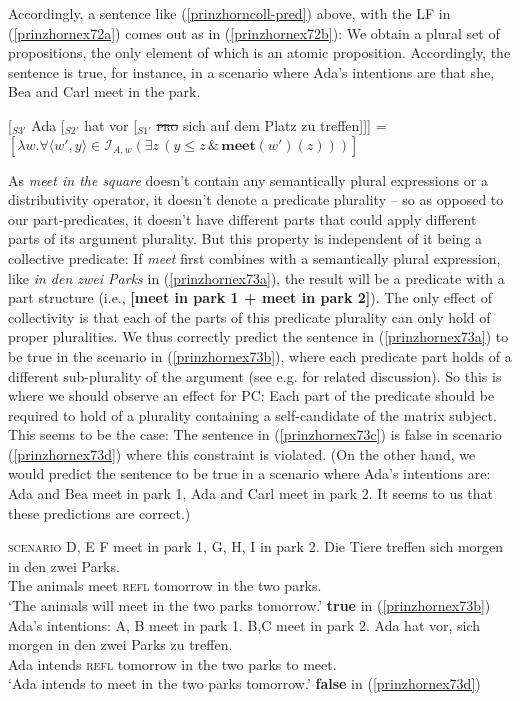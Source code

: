 \documentclass[output=paper,colorlinks,citecolor=brown,
]{langscibook}
\begin{document}
Accordingly, a sentence like (\ref{prinzhorncoll-pred}) above, with the LF in (\ref{prinzhornex72a}) comes out as in (\ref{prinzhornex72b}): We obtain a plural set of propositions, the only element of which is an atomic proposition. Accordingly, the sentence is true, for instance, in a scenario where Ada's intentions are that she, Bea and Carl meet in the park.

\ea
\ea   \label{prinzhornex72a} [$_{S3'}$ Ada [$_{S2'}$ hat vor [$_{S1'}$ \sout{\textsc{pro}} sich auf dem Platz zu treffen]]]
\ex {} =  $[\lambda w.  \forall \langle w' ,y \rangle \in \mathcal{I}_{A,w} (\exists z \, (y \le z\, \& \,\textbf{meet}(w')(z)))]$\label{prinzhornex72b}
\z\z

As \textit{meet in the square} doesn't contain any semantically plural expressions or a distributivity operator, it doesn't denote a predicate plurality -- so as opposed to our part-predicates, it doesn't have different parts that could apply different parts of its argument plurality. But this property is independent of it being a collective predicate: If \textit{meet} first combines with a semantically plural expression,  like \textit{in den zwei Parks} in (\ref{prinzhornex73a}), the result will be a predicate with a part structure (i.e., \textbf{[meet in park 1 + meet in park 2]}). The only effect of collectivity is that each of the parts of this predicate plurality can only hold of proper pluralities. We  thus correctly predict the sentence in (\ref{prinzhornex73a}) to be true in the scenario in (\ref{prinzhornex73b}), where each predicate part holds of a different sub-plurality of the argument (see e.g. \citealt{Schwarzschild:1996} for related discussion). So this is where we should observe an effect for PC: Each part of the predicate should  be required to hold of a plurality containing a self-candidate of the matrix subject. This  seems to be the case: The sentence in (\ref{prinzhornex73c}) is false in scenario (\ref{prinzhornex73d}) where this constraint is violated. (On the other hand, we would predict the sentence to be true in a scenario where Ada's intentions are: Ada and Bea meet in park 1, Ada and Carl meet in park 2. It seems to us that these predictions are correct.)

\ea 
\ea \textsc{scenario}  D, E F meet in park 1, G, H, I in  park 2.  \label{prinzhornex73b}
\ex \gll Die Tiere treffen sich morgen in den zwei Parks.\\
The animals meet \textsc{refl} tomorrow in the two parks.\\
\glt `The animals will meet in the two parks tomorrow.'  \phantom{.}\hfill \textbf{true} in (\ref{prinzhornex73b})\label{prinzhornex73a}
\ex Ada's intentions: A, B meet in park 1. B,C meet in park 2. \label{prinzhornex73d}
\ex \gll Ada hat vor, sich morgen in den zwei Parks zu treffen.\\
Ada intends {} \textsc{refl} tomorrow in the two parks to meet.\\
\glt `Ada intends to meet in the two parks tomorrow.' \label{prinzhornex73c} \phantom{.}\hfill \textbf{false} in (\ref{prinzhornex73d})
\z\z
\end{document}
